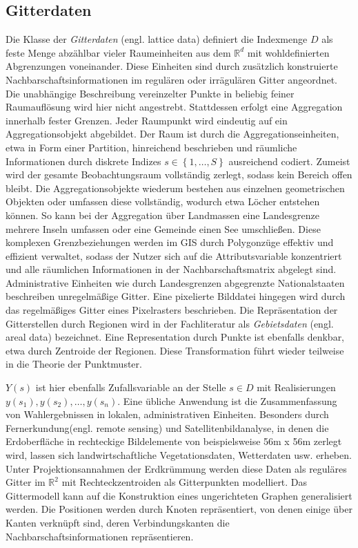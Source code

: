 \subsection*{Gitterdaten} 
\label{subsec:latticedata}
Die Klasse der \emph{Gitterdaten} (engl. lattice data) definiert die Indexmenge $D$ als 
feste Menge abzählbar vieler Raumeinheiten aus dem $\mathds{R}^d$ 
mit wohldefinierten Abgrenzungen voneinander. 
Diese Einheiten sind durch zusätzlich konstruierte Nachbarschaftsinformationen 
im regulären oder irrägulären Gitter angeordnet. 
Die unabhängige Beschreibung vereinzelter Punkte in beliebig feiner Raumauflösung 
wird hier nicht angestrebt. 
Stattdessen erfolgt eine Aggregation innerhalb fester Grenzen.  
Jeder Raumpunkt wird eindeutig auf ein Aggregationsobjekt abgebildet. 
Der Raum ist durch die Aggregationseinheiten, etwa in Form einer Partition, 
hinreichend beschrieben und räumliche Informationen 
durch diskrete Indizes $s \in \left\{ 1,\ldots,S \right\}$ ausreichend codiert. 
Zumeist wird der gesamte Beobachtungsraum vollständig zerlegt, 
sodass kein Bereich offen bleibt. 
Die Aggregationsobjekte wiederum bestehen aus einzelnen geometrischen Objekten
oder umfassen diese vollständig, wodurch etwa Löcher entstehen können. 
So kann bei der Aggregation über Landmassen eine Landesgrenze 
mehrere Inseln umfassen oder eine Gemeinde einen See umschließen. 
Diese komplexen Grenzbeziehungen werden im GIS durch Polygonzüge 
effektiv und effizient verwaltet, 
sodass der Nutzer sich auf die Attributsvariable konzentriert 
und alle räumlichen Informationen in der Nachbarschaftsmatrix abgelegt sind.\\

Administrative Einheiten wie durch Landesgrenzen abgegrenzte Nationalstaaten 
beschreiben unregelmäßige Gitter. Eine pixelierte Bilddatei hingegen 
wird durch das regelmäßiges Gitter eines Pixelrasters beschrieben. 
Die Repräsentation der Gitterstellen durch Regionen wird in der Fachliteratur 
als \emph{Gebietsdaten} (engl. areal data) bezeichnet. 
Eine Representation durch Punkte ist ebenfalls denkbar, etwa durch 
Zentroide der Regionen. Diese Transformation führt wieder teilweise 
in die Theorie der Punktmuster.

$Y(s)$ ist hier ebenfalls Zufallsvariable an der Stelle $s \in D$ mit 
Realisierungen  $ y(s_1),y(s_2),\ldots,y(s_n)$.
Eine übliche Anwendung ist die Zusammenfassung von Wahlergebnissen in lokalen, 
administrativen Einheiten. 
Besonders durch Fernerkundung(engl. remote sensing) und Satellitenbildanalyse, 
in denen die Erdoberfläche in rechteckige Bildelemente von 
beispielsweise 56m x 56m zerlegt wird, lassen sich landwirtschaftliche 
Vegetationsdaten, Wetterdaten usw. erheben.
Unter Projektionsannahmen der Erdkrümmung werden diese Daten als reguläres 
Gitter im $\mathds{R}^2$ mit Rechteckzentroiden als Gitterpunkten modelliert. 
Das Gittermodell kann auf die Konstruktion eines ungerichteten Graphen 
generalisiert werden. Die Positionen werden durch Knoten repräsentiert, 
von denen einige über Kanten verknüpft sind, deren Verbindungskanten 
die Nachbarschaftsinformationen repräsentieren. \\

